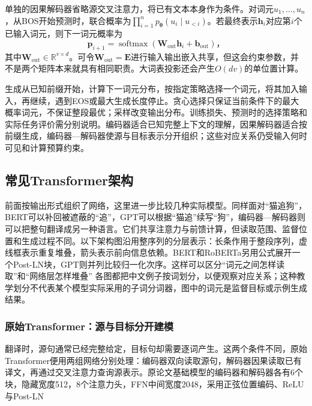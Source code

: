 单独的因果解码器省略源交叉注意力，将已有文本本身作为条件。对词元$u_1,\ldots,u_n$，从BOS开始预测时，联合概率为$\prod_{i=1}^n p_{\bm\theta}(u_i\mid u_{<i})$。若最终表示$\bm h_i$对应第$i$个已输入词元，则下一词元概率为
\begin{equation}
  \bm p_{i+1}=\operatorname{softmax}
     (\bm W_{\mathrm{out}}\bm h_i+\bm b_{\mathrm{out}})\text{，}
  \label{eq:transformer-vocabulary-head}
\end{equation}
其中$\bm W_{\mathrm{out}}\in\mathbb R^{v\times d}$。可令$\bm W_{\mathrm{out}}=\bm E$进行输入输出嵌入共享，但这会约束参数，并不是两个矩阵本来就具有相同职责。大词表投影还会产生$O(dv)$的单位置计算。

生成从已知前缀开始，计算下一词元分布，按指定策略选择一个词元，将其加入输入，再继续，遇到EOS或最大生成长度停止。贪心选择只保证当前条件下的最大概率词元，不保证整段最优；采样改变输出分布。训练损失、预测时的选择策略和实际任务评价需分别说明。编码器适合已知完整上下文的理解，因果解码器适合按前缀生成，编码器—解码器使源与目标表示分开组织；这些对应关系仍受输入何时可见和计算预算约束。

\subsection{常见Transformer架构}
\label{sec:transformer-common-architectures}

前面按输出形式组织了网络，这里进一步比较几种实际模型。同样面对“猫追狗”，BERT可以补回被遮蔽的“追”，GPT可以根据“猫追”续写“狗”，编码器—解码器则可以把整句翻译成另一种语言。它们共享注意力与前馈计算，但读取范围、监督位置和生成过程不同。以下架构图沿用整序列的分层表示：长条作用于整段序列，虚线框表示重复堆叠，箭头表示前向信息依赖。BERT和RoBERTa另用公式展开一个Post-LN块，GPT则并列比较归一化次序。这样可以区分“词元之间怎样读取”和“网络层怎样堆叠” 各图都把中文例子按词划分，以便观察对应关系；这种教学划分不代表某个模型实际采用的子词分词器，图中的词元是监督目标或示例生成结果。

\subsubsection{原始Transformer：源与目标分开建模}

翻译时，源句通常已经完整给定，目标句却需要逐词产生。这两个条件不同，原始Transformer便用两组网络分别处理：编码器双向读取源句，解码器因果读取已有译文，再通过交叉注意力查询源表示。原论文基础模型的编码器和解码器各有6个块，隐藏宽度512，8个注意力头，FFN中间宽度2048，采用正弦位置编码、ReLU与Post-LN


